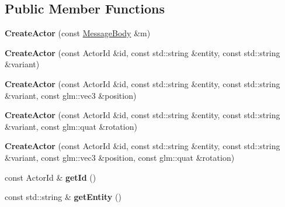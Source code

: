 \subsection*{Public Member Functions}
\begin{DoxyCompactItemize}
\item 
\mbox{\label{classTarbora_1_1Message_1_1CreateActor_a501ffd356544e55a1b9fb4e6f7620259}} 
{\bfseries Create\+Actor} (const \hyperlink{classTarbora_1_1MessageBody}{Message\+Body} \&m)
\item 
\mbox{\label{classTarbora_1_1Message_1_1CreateActor_a21f3d9d4de2508519868d6b7db21e1a5}} 
{\bfseries Create\+Actor} (const Actor\+Id \&id, const std\+::string \&entity, const std\+::string \&variant)
\item 
\mbox{\label{classTarbora_1_1Message_1_1CreateActor_a19ba27e4e49e3c3546ece8abedd02649}} 
{\bfseries Create\+Actor} (const Actor\+Id \&id, const std\+::string \&entity, const std\+::string \&variant, const glm\+::vec3 \&position)
\item 
\mbox{\label{classTarbora_1_1Message_1_1CreateActor_a61b1b77a3ee2eccd9b2938db1a6804ad}} 
{\bfseries Create\+Actor} (const Actor\+Id \&id, const std\+::string \&entity, const std\+::string \&variant, const glm\+::quat \&rotation)
\item 
\mbox{\label{classTarbora_1_1Message_1_1CreateActor_a8e1d258d129e43403dacf00939cf19ea}} 
{\bfseries Create\+Actor} (const Actor\+Id \&id, const std\+::string \&entity, const std\+::string \&variant, const glm\+::vec3 \&position, const glm\+::quat \&rotation)
\item 
\mbox{\label{classTarbora_1_1Message_1_1CreateActor_a945d190ee49b62ad72ea6a42874d924a}} 
const Actor\+Id \& {\bfseries get\+Id} ()
\item 
\mbox{\label{classTarbora_1_1Message_1_1CreateActor_a8afc9f7695e460c7307154509841c77a}} 
const std\+::string \& {\bfseries get\+Entity} ()
\item 

\end{DoxyCompactItemize}
